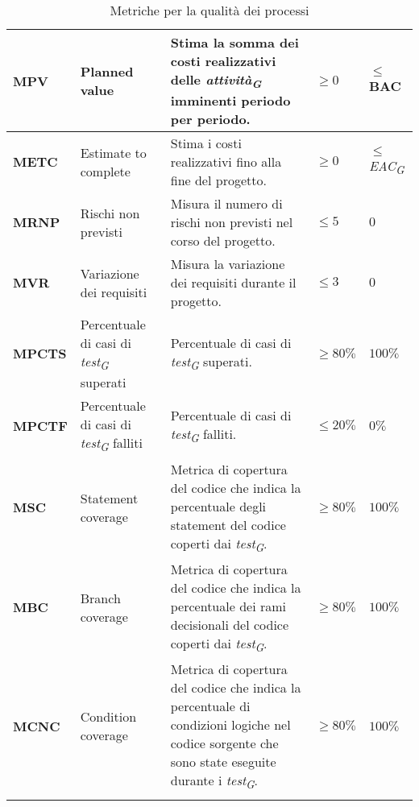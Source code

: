 \begin{longtable}{|C{1.9cm}|L{4cm}|L{4cm}|L{2.2cm}|L{2.1cm}|}
\textbf{MPV} & Planned value & Stima la somma dei costi realizzativi delle \textit{attività}\textsubscript{\textit{G}} imminenti periodo per periodo. & $\geq 0 $ & $ \leq$ BAC \\
\hline

\textbf{METC} & Estimate to complete & Stima i costi realizzativi fino alla fine del progetto. & $\geq 0 $ & $ \leq$ \textit{EAC}\textsubscript{\textit{G}} \\
\hline

\textbf{MRNP} & Rischi non previsti & Misura il numero di rischi non previsti nel corso del progetto. & $\leq 5$ & $0$ \\
\hline

\textbf{MVR} & Variazione dei requisiti & Misura la variazione dei requisiti durante il progetto. & $\leq 3$ & $0$ \\
\hline

\textbf{MPCTS} & Percentuale di casi di \textit{test}\textsubscript{\textit{G}} superati & Percentuale di casi di \textit{test}\textsubscript{\textit{G}} superati. & $\geq 80\%$ & $100\%$ \\
\hline

\textbf{MPCTF} & Percentuale di casi di \textit{test}\textsubscript{\textit{G}} falliti & Percentuale di casi di \textit{test}\textsubscript{\textit{G}} falliti. & $\leq 20\%$ & $0\%$ \\
\hline

\textbf{MSC} & Statement coverage & Metrica di copertura del codice che indica la percentuale degli statement del codice coperti dai \textit{test}\textsubscript{\textit{G}}. & $\geq 80\%$ & $100\%$ \\
\hline

\textbf{MBC} & Branch coverage & Metrica di copertura del codice che indica la percentuale dei rami decisionali del codice coperti dai \textit{test}\textsubscript{\textit{G}}. & $\geq 80\%$ & $100\%$ \\
\hline

\textbf{MCNC} & Condition coverage & Metrica di copertura del codice che indica la percentuale di condizioni logiche nel codice sorgente che sono state eseguite durante i \textit{test}\textsubscript{\textit{G}}. & $\geq 80\%$ & $100\%$ \\
\hline

\caption{Metriche per la qualità dei processi}
\label{tab:qualità_processo_progetto}
\end{longtable}


